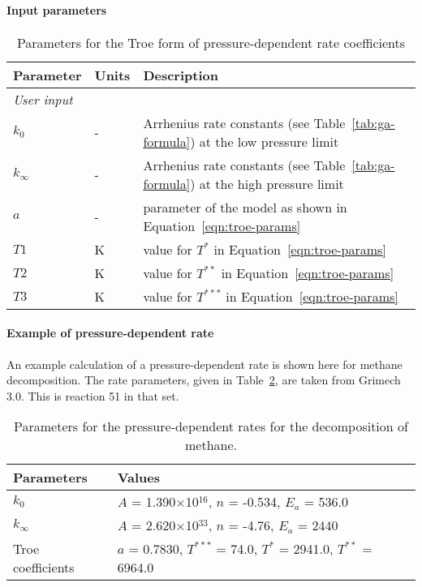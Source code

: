\paragraph{Input parameters}
\begin{table}[h!]
\centering
\caption{Parameters for the Troe form of pressure-dependent rate coefficients}
\label{tab:troe-pd}
\begin{tabular}{llp{10cm}}
\toprule
Parameter & Units & Description \\ \midrule
\multicolumn{3}{l}{\textit{User input}} \\
$k_0$       & - & Arrhenius rate constants (see Table~\ref{tab:ga-formula}) at the
              low pressure limit \\
$k_{\infty}$ & - & Arrhenius rate constants (see Table~\ref{tab:ga-formula}) at the
              high pressure limit \\
$a$         & - & parameter of the model as shown in Equation~\ref{eqn:troe-params} \\
$T1$       & K & value for $T^*$ in Equation~\ref{eqn:troe-params} \\
$T2$     & K & value for $T^{**}$ in Equation~\ref{eqn:troe-params} \\
$T3$    & K & value for $T^{***}$ in Equation~\ref{eqn:troe-params} \\
\bottomrule
\end{tabular}
\end{table}

\paragraph{Example of pressure-dependent rate}
An example calculation of a pressure-dependent rate
is shown here for methane decomposition.
The rate parameters, given in Table~\ref{tab:meth-decomp},
are taken from Grimech 3.0.
This is reaction 51 in that set.

\begin{table}[h]
\centering
\caption{Parameters for the pressure-dependent rates for the decomposition of
methane.}
\label{tab:meth-decomp}
\begin{tabular}{ll}
\toprule
Parameters & Values \\ \midrule
$k_0$ & $A$ = 1.390$\times$10$^{16}$, $n$ = -0.534, $E_a$ = 536.0 \\
$k_{\infty}$ & $A$ = 2.620$\times$10$^{33}$, $n$ = -4.76, $E_a$ = 2440 \\
Troe coefficients & $a$ = 0.7830, $T^{***}$ = 74.0, $T^{*}$ = 2941.0, $T^{**}$ = 6964.0 \\ \bottomrule
\end{tabular}
\end{table}

